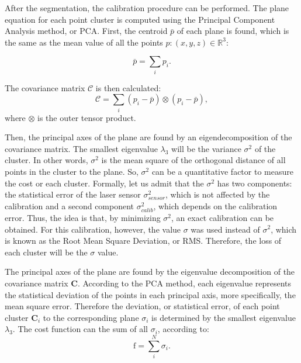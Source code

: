 \documentclass[conference]{IEEEtran}
\begin{document}
After the segmentation, the calibration procedure can be performed. The plane equation for each point cluster is computed using the Principal Component Analysis method, or PCA. First, the centroid $\bar{p}$ of each plane is found, which is the same as the mean value of all the points $p: (x, y, z) \in \mathds{R}^3$:

\begin{equation}
    \bar{p} = \sum_{i}{p_i}.
        \label{eqn:centroid-plane}
\end{equation}

The covariance matrix $\mathcal{C}$ is then calculated:
%
\begin{equation}
    \mathcal{C} = \sum_{i}{(p_i - \bar{p}) \otimes (p_i - \bar{p})},
        \label{eqn:covariance-matrix}
\end{equation}
%
\noindent where $\otimes$ is the outer tensor product.

Then, the principal axes of the plane are found by an eigendecomposition of the covariance matrix. The smallest eigenvalue $\lambda_3$ will be the variance $\sigma^2$ of the cluster. In other words, $\sigma^2$ is the mean square of the orthogonal distance of all points in the cluster to the plane. So, $\sigma^2$ can be a quantitative factor to measure the cost or each cluster. Formally, let us admit that the $\sigma^2$ has two components: the statistical error of the laser sensor $\sigma^2_{sensor}$, which is not affected by the calibration and a second component $\sigma^2_{calib}$, which depends on the calibration error. Thus, the idea is that, by minimizing $\sigma^2$, an exact calibration can be obtained. For this calibration, however, the value $\sigma$ was used instead of $\sigma^2$, which is known as the Root Mean Square Deviation, or RMS. Therefore, the loss of each cluster will be the $\sigma$ value.

The principal axes of the plane are found by the eigenvalue decomposition of the covariance matrix $\bm{C}$. According to the PCA method, each eigenvalue represents the statistical deviation of the points in each principal axis, more specifically, the mean square error. Therefore the deviation, or statistical error, of each point cluster $\bm{C}_i$ to the corresponding plane $\sigma_i$ is determined by the smallest eigenvalue $\lambda_3$. The cost function can the sum of all $\sigma_i$, according to:
%
\begin{equation}
    \textrm{f} = \sum_{i}^{N}{\sigma_i}.
\end{equation}
\end{document}
